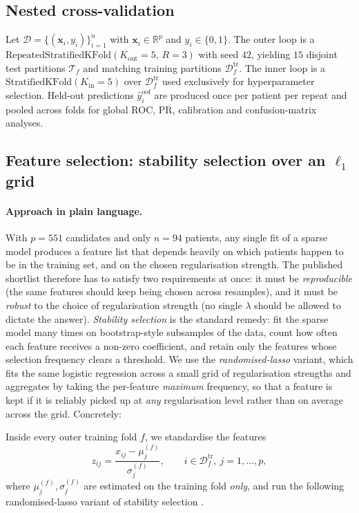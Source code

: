 \documentclass[11pt,a4paper]{article}
\begin{document}
\subsection{Nested cross-validation}
Let $\mathcal{D} = \{(\bm{x}_i, y_i)\}_{i=1}^{n}$ with $\bm{x}_i \in
\mathbb{R}^{p}$ and $y_i \in \{0,1\}$. The outer loop is a
$\mathrm{RepeatedStratifiedKFold}(K_\mathrm{out}=5,\,R=3)$ with seed $42$,
yielding $15$ disjoint test partitions $\mathcal{T}_f$ and matching
training partitions $\mathcal{D}_f^{\mathrm{tr}}$. The inner loop is a
$\mathrm{StratifiedKFold}(K_\mathrm{in}=5)$ over $\mathcal{D}_f^{\mathrm{tr}}$
used exclusively for hyperparameter selection. Held-out predictions
$\hat{y}_i^{\mathrm{oof}}$ are produced once per patient per repeat and
pooled across folds for global ROC, PR, calibration and confusion-matrix
analyses.

\subsection{Feature selection: stability selection over an $\ell_1$ grid}
\label{sec:stab}

\paragraph{Approach in plain language.}
With $p=551$ candidates and only $n=94$ patients, any single fit of a
sparse model produces a feature list that depends heavily on which
patients happen to be in the training set, and on the chosen
regularisation strength. The published shortlist therefore has to
satisfy two requirements at once: it must be \emph{reproducible} (the
same features should keep being chosen across resamples), and it must be
\emph{robust} to the choice of regularisation strength (no single
$\lambda$ should be allowed to dictate the answer). \emph{Stability
selection} \cite{} is the standard remedy: fit the sparse model many
times on bootstrap-style subsamples of the data, count how often each
feature receives a non-zero coefficient, and retain only the features
whose selection frequency clears a threshold. We use the
\emph{randomised-lasso} variant, which fits the same logistic regression
across a small grid of regularisation strengths and aggregates by taking
the per-feature \emph{maximum} frequency, so that a feature is kept if
it is reliably picked up at \emph{any} regularisation level rather than
on average across the grid. Concretely:

Inside every outer training fold $f$, we standardise the features
\[
  z_{ij} = \frac{x_{ij} - \mu_j^{(f)}}{\sigma_j^{(f)}}, \qquad
  i \in \mathcal{D}_f^{\mathrm{tr}},\ j=1,\dots,p,
\]
where $\mu_j^{(f)}, \sigma_j^{(f)}$ are estimated on the training fold
\emph{only}, and run the following randomised-lasso variant of stability
selection \cite{}.
\end{document}
